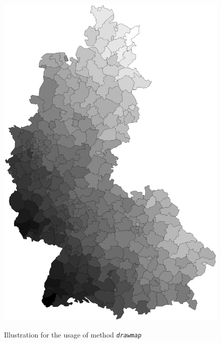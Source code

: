 \begin{figure}[ht]
\begin{center}
\includegraphics[scale=0.4]{grafiken/drawmapexample.ps}
{\em\caption{ \label{drawmapexample1} Illustration for the usage
of method \em \texttt{drawmap}}}
\end{center}
\end{figure}


